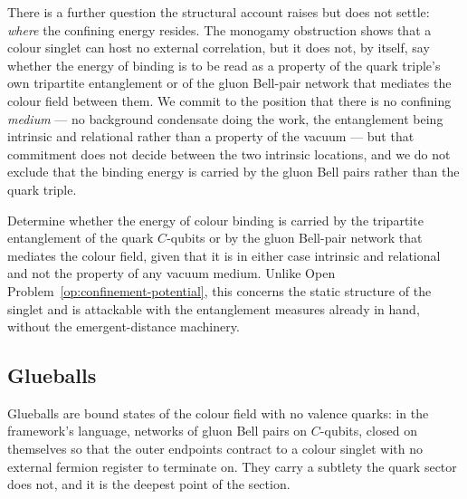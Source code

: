 There is a further question the structural account raises but does not settle: \emph{where} the
confining energy resides. The monogamy obstruction shows that a colour singlet can host no external
correlation, but it does not, by itself, say whether the energy of binding is to be read as a
property of the quark triple's own tripartite entanglement or of the gluon Bell-pair network that
mediates the colour field between them. We commit to the position that there is no confining
\emph{medium} --- no background condensate doing the work, the entanglement being intrinsic and
relational rather than a property of the vacuum --- but that commitment does not decide between the
two intrinsic locations, and we do not exclude that the binding energy is carried by the gluon Bell
pairs rather than the quark triple.

\begin{openproblem}\label{op:confinement-energy-locus}
Determine whether the energy of colour binding is carried by the tripartite entanglement of the
quark $C$-qubits or by the gluon Bell-pair network that mediates the colour field, given that it is
in either case intrinsic and relational and not the property of any vacuum medium. Unlike
Open Problem~\ref{op:confinement-potential}, this concerns the static structure of the singlet and
is attackable with the entanglement measures already in hand, without the emergent-distance
machinery.
\end{openproblem}

\subsection{Glueballs}

Glueballs are bound states of the colour field with no valence quarks: in the framework's language,
networks of gluon Bell pairs on $C$-qubits, closed on themselves so that the outer endpoints
contract to a colour singlet with no external fermion register to terminate on. They carry a subtlety
the quark sector does not, and it is the deepest point of the section.

